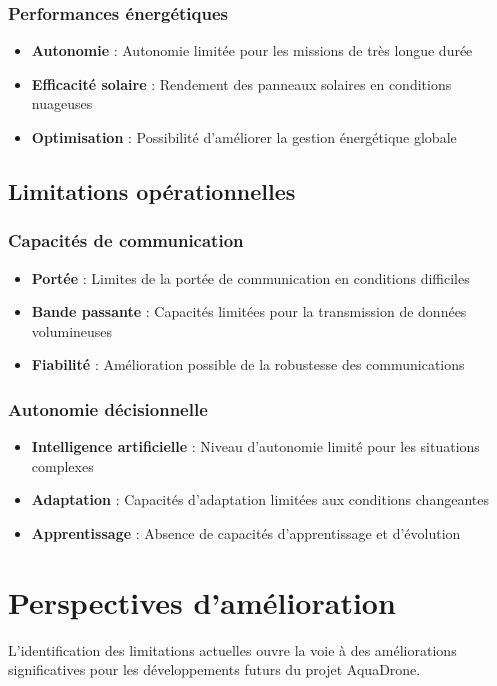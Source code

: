 {\subsubsection{Performances énergétiques}
\begin{itemize}
    \item \textbf{Autonomie} : Autonomie limitée pour les missions de très longue durée
    \item \textbf{Efficacité solaire} : Rendement des panneaux solaires en conditions nuageuses
    \item \textbf{Optimisation} : Possibilité d'améliorer la gestion énergétique globale
\end{itemize}

\subsection{Limitations opérationnelles}
\subsubsection{Capacités de communication}
\begin{itemize}
    \item \textbf{Portée} : Limites de la portée de communication en conditions difficiles
    \item \textbf{Bande passante} : Capacités limitées pour la transmission de données volumineuses
    \item \textbf{Fiabilité} : Amélioration possible de la robustesse des communications
\end{itemize}

\subsubsection{Autonomie décisionnelle}
\begin{itemize}
    \item \textbf{Intelligence artificielle} : Niveau d'autonomie limité pour les situations complexes
    \item \textbf{Adaptation} : Capacités d'adaptation limitées aux conditions changeantes
    \item \textbf{Apprentissage} : Absence de capacités d'apprentissage et d'évolution
\end{itemize}

\section{Perspectives d'amélioration}
L'identification des limitations actuelles ouvre la voie à des améliorations significatives pour les développements futurs du projet AquaDrone.

}
